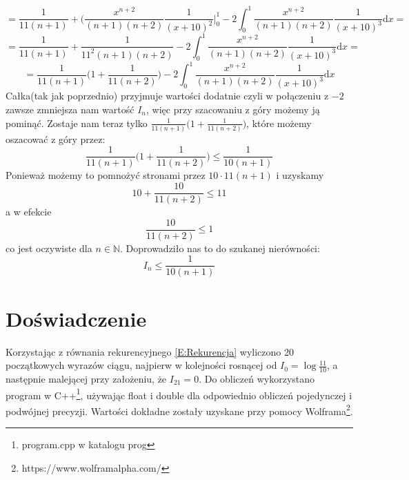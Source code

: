 \documentclass[11pt,leqno]{article}
\begin{document}
$$
    =
    \frac{1}{11(n+1)} + \Bigg(\frac{x^{n+2}}{(n+1)(n+2)}\frac{1}{(x+10)^2}\Bigg|_{0}^{1} - 2\int_{0}^{1} \frac{x^{n+2}}{(n+1)(n+2)}\frac{1}{(x+10)^3} \mathrm{d}x =
$$
$$
    =
    \frac{1}{11(n+1)} + \frac{1}{11^2(n+1)(n+2)} - 2\int_{0}^{1} \frac{x^{n+2}}{(n+1)(n+2)}\frac{1}{(x+10)^3} \mathrm{d}x =
$$
$$
    =
    \frac{1}{11(n+1)}\Bigg(1 + \frac{1}{11(n+2)}\Bigg) - 2\int_{0}^{1} \frac{x^{n+2}}{(n+1)(n+2)}\frac{1}{(x+10)^3} \mathrm{d}x
$$
Całka(tak jak poprzednio) przyjmuje wartości dodatnie czyli w połączeniu z $-2$ zawsze zmniejsza nam wartość $I_{n}$,
więc przy szacowaniu z góry możemy ją pominąć.
Zostaje nam teraz tylko $\frac{1}{11(n+1)}\Big(1 + \frac{1}{11(n+2)}\Big)$, które możemy oszacować z góry przez:
$$
    \frac{1}{11(n+1)}\Bigg(1 + \frac{1}{11(n+2)}\Bigg) \leq \frac{1}{10(n+1)}
$$
Ponieważ możemy to pomnożyć stronami przez $10\cdot11(n+1)$ i uzyskamy
$$
    10 + \frac{10}{11(n+2)} \leq 11
$$
a w efekcie
$$
    \frac{10}{11(n+2)} \leq 1
$$
co jest oczywiste dla $n \in \mathbb{N}$.
Doprowadziło nas to do szukanej nierówności:
$$
    I_{n} \leq \frac{1}{10(n+1)}
$$
\section{Doświadczenie}\label{S:Doświadczenie}
Korzystając z równania rekurencyjnego \eqref{E:Rekurencja} wyliczono 20 początkowych wyrazów ciągu,
najpierw w kolejności rosnącej od $I_{0} = \log\frac{11}{10}$, a następnie malejącej przy założeniu,
że $I_{21} = 0$. Do obliczeń wykorzystano program w C++\footnote{program.cpp w katalogu prog},
używając float i double dla odpowiednio obliczeń pojedynczej i podwójnej precyzji.
Wartości dokładne zostały uzyskane przy pomocy Wolframa\footnote{https://www.wolframalpha.com/}.
\end{document}
